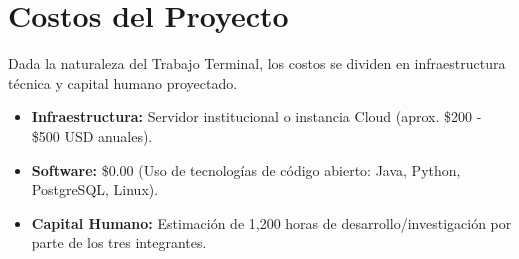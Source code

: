 \section{Costos del Proyecto}
Dada la naturaleza del Trabajo Terminal, los costos se dividen en infraestructura técnica y capital humano proyectado.

\begin{itemize}
    \item \textbf{Infraestructura:} Servidor institucional o instancia Cloud (aprox. \$200 - \$500 USD anuales).
    \item \textbf{Software:} \$0.00 (Uso de tecnologías de código abierto: Java, Python, PostgreSQL, Linux).
    \item \textbf{Capital Humano:} Estimación de 1,200 horas de desarrollo/investigación por parte de los tres integrantes.
\end{itemize}